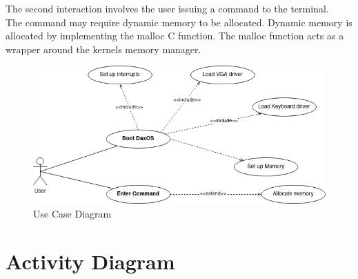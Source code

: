 \begin{flushleft}
The second interaction involves the user issuing a command to the terminal. \\
The command may require dynamic memory to be allocated. Dynamic memory is
allocated by implementing the malloc C function. The malloc function acts as a
wrapper around the kernels memory manager. 
\end{flushleft}




\begin{figure}[h!]
	\includegraphics[width=\textwidth,height=\textheight,keepaspectratio]{use-case}
	\caption{Use Case Diagram}
\end{figure}

\pagebreak

\section{Activity Diagram}

